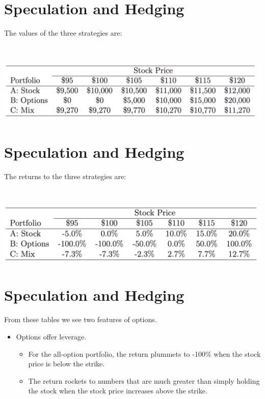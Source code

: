 \documentclass[letterpaper,10pt,english]{sphinxmanual}
\begin{document}
\section{Speculation and Hedging}
\label{options:id13}
The values of the three strategies are:

$\qquad$

{\hfill\includegraphics[width=8in]{table1.png}\hfill}


\section{Speculation and Hedging}
\label{options:id14}
The returns to the three strategies are:

$\qquad$

{\hfill\includegraphics[width=8in]{table2.png}\hfill}


\section{Speculation and Hedging}
\label{options:id15}
From these tables we see two features of options.
\begin{itemize}
\item {} 
Options offer leverage.
\begin{itemize}
\item {} 
For the all-option portfolio, the return plummets to -100\% when
the stock price is below the strike.

\end{itemize}
\begin{itemize}
\item {} 
The return rockets to numbers that are much greater than simply
holding the stock when the stock price increases above the
strike.

\end{itemize}

\end{itemize}
\end{document}
